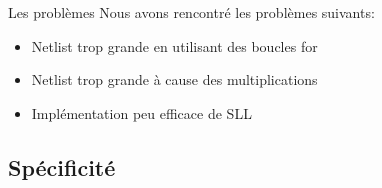 \documentclass{beamer}
\begin{document}
\begin{frame}{Les problèmes}
    Nous avons rencontré les problèmes suivants:
    \begin{itemize}
        \item Netlist trop grande en utilisant des boucles for
        \item Netlist trop grande à cause des multiplications
        \item Implémentation peu efficace de SLL 
    \end{itemize}
\end{frame}



\subsection{Spécificité}
\end{document}
